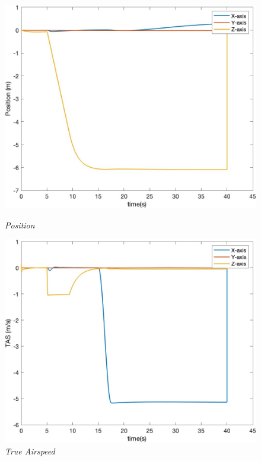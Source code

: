 \begin{figure}[htbp]
  \centering
  \begin{minipage}[b]{0.45\textwidth}
    \centering
    \includegraphics[width=\textwidth]{Images/Gust/VTOL step/1 position_2.jpg}
    \caption*{\textit{Position}}
  \end{minipage}
  \hfil
  \begin{minipage}[b]{0.45\textwidth}
    \centering
    \includegraphics[width=\textwidth]{Images/Gust/VTOL step/2 airspeed_2.jpg}
    \caption*{\textit{True Airspeed}}
  \end{minipage}

\end{figure}
